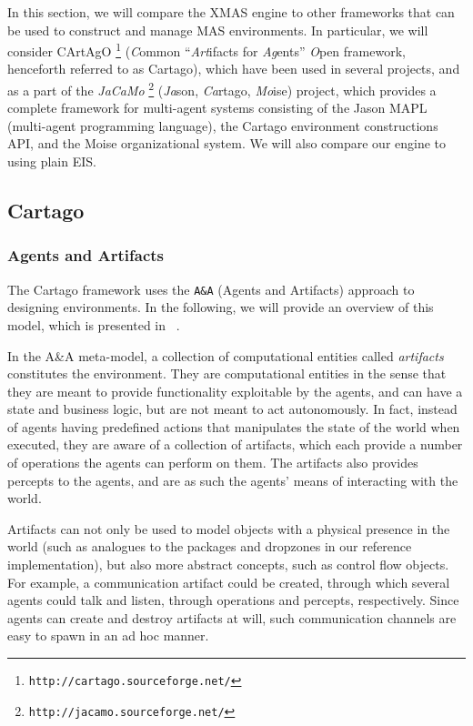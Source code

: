 In this section, we will compare the XMAS engine to other frameworks
that can be used to construct and manage MAS environments. In particular,
we will consider CArtAgO%
\footnote{\texttt{http://cartago.sourceforge.net/}%
} (\emph{C}ommon ``\emph{Art}ifacts for \emph{Ag}ents'' \emph{O}pen
framework, henceforth referred to as Cartago), which have been used
in several projects, and as a part of the \emph{JaCaMo}%
\footnote{\texttt{http://jacamo.sourceforge.net/}%
} (\emph{Ja}son, \emph{Ca}rtago, \emph{Mo}ise) project, which provides
a complete framework for multi-agent systems consisting of the Jason
MAPL (multi-agent programming language), the Cartago environment constructions
API, and the Moise organizational system. We will also compare our
engine to using plain EIS.


\subsection{Cartago}


\subsubsection*{Agents and Artifacts}

The Cartago framework uses the \texttt{A\&A} (Agents and Artifacts)
approach to designing environments. In the following, we will provide
an overview of this model, which is presented in ~\cite{Ricci08}.

In the A\&A meta-model, a collection of computational entities called
\emph{artifacts} constitutes the environment. They are computational
entities in the sense that they are meant to provide functionality
exploitable by the agents, and can have a state and business logic,
but are not meant to act autonomously. In fact, instead of agents
having predefined actions that manipulates the state of the world
when executed, they are aware of a collection of artifacts, which
each provide a number of operations the agents can perform on them.
The artifacts also provides percepts to the agents, and are as such
the agents' means of interacting with the world. 

Artifacts can not only be used to model objects with a physical presence
in the world (such as analogues to the packages and dropzones in our
reference implementation), but also more abstract concepts, such as
control flow objects. For example, a communication artifact could
be created, through which several agents could talk and listen, through
operations and percepts, respectively. Since agents can create and
destroy artifacts at will, such communication channels are easy to
spawn in an ad hoc manner.

